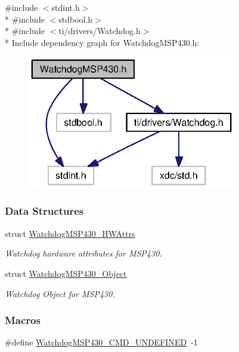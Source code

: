 {\ttfamily \#include $<$stdint.\-h$>$}\\*
{\ttfamily \#include $<$stdbool.\-h$>$}\\*
{\ttfamily \#include $<$ti/drivers/\-Watchdog.\-h$>$}\\*
Include dependency graph for Watchdog\-M\-S\-P430.\-h\-:
\nopagebreak
\begin{figure}[H]
\begin{center}
\leavevmode
\includegraphics[width=259pt]{_watchdog_m_s_p430_8h__incl}
\end{center}
\end{figure}
\subsubsection*{Data Structures}
\begin{DoxyCompactItemize}
\item 
struct \hyperlink{struct_watchdog_m_s_p430___h_w_attrs}{Watchdog\-M\-S\-P430\-\_\-\-H\-W\-Attrs}
\begin{DoxyCompactList}\small\item\em Watchdog hardware attributes for M\-S\-P430. \end{DoxyCompactList}\item 
struct \hyperlink{struct_watchdog_m_s_p430___object}{Watchdog\-M\-S\-P430\-\_\-\-Object}
\begin{DoxyCompactList}\small\item\em Watchdog Object for M\-S\-P430. \end{DoxyCompactList}\end{DoxyCompactItemize}
\subsubsection*{Macros}
\begin{DoxyCompactItemize}
\item 
\#define \hyperlink{_watchdog_m_s_p430_8h_a513f6cf0d1683de949d8ec8079d5470c}{Watchdog\-M\-S\-P430\-\_\-\-C\-M\-D\-\_\-\-U\-N\-D\-E\-F\-I\-N\-E\-D}~-\/1
\end{DoxyCompactItemize}
